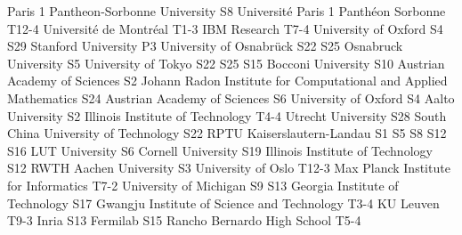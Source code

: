 \begin{multicols}{2}
{Paris 1 Pantheon-Sorbonne University}
{S8}
{}
{}
{}
{}
{}
{}
{Université Paris 1 Panthéon Sorbonne}
{T12-4}
{}
{}
{}
{}
{}
{}
{Université de Montréal}
{T1-3}
{}
{}
{}
{}
{}
{}
{IBM Research}
{T7-4}
{}
{}
{}
{}
{}
{}
{University of Oxford}
{S4}
{S29}
{}
{}
{}
{}
{}
{Stanford University}
{P3}
{}
{}
{}
{}
{}
{}
{University of Osnabrück}
{S22}
{S25}
{}
{}
{}
{}
{}
{Osnabruck University}
{S5}
{}
{}
{}
{}
{}
{}
{University of Tokyo}
{S22}
{S25}
{S15}
{}
{}
{}
{}
{Bocconi University}
{S10}
{}
{}
{}
{}
{}
{}
{Austrian Academy of Sciences}
{S2}
{}
{}
{}
{}
{}
{}
{Johann Radon Institute for Computational and Applied Mathematics}
{S24}
{}
{}
{}
{}
{}
{}
{Austrian Academy of Sciences}
{S6}
{}
{}
{}
{}
{}
{}
{University of Oxford}
{S4}
{}
{}
{}
{}
{}
{}
{Aalto University}
{S2}
{}
{}
{}
{}
{}
{}
{Illinois Institute of Technology}
{T4-4}
{}
{}
{}
{}
{}
{}
{Utrecht University}
{S28}
{}
{}
{}
{}
{}
{}
{South China University of Technology}
{S22}
{}
{}
{}
{}
{}
{}
{RPTU Kaiserslautern-Landau}
{S1}
{S5}
{S8}
{S12}
{S16}
{}
{}
{LUT University}
{S6}
{}
{}
{}
{}
{}
{}
{Cornell University}
{S19}
{}
{}
{}
{}
{}
{}
{Illinois Institute of Technology}
{S12}
{}
{}
{}
{}
{}
{}
{RWTH Aachen University}
{S3}
{}
{}
{}
{}
{}
{}
{University of Oslo}
{T12-3}
{}
{}
{}
{}
{}
{}
{Max Planck Institute for Informatics}
{T7-2}
{}
{}
{}
{}
{}
{}
{University of Michigan}
{S9}
{S13}
{}
{}
{}
{}
{}
{Georgia Institute of Technology}
{S17}
{}
{}
{}
{}
{}
{}
{Gwangju Institute of Science and Technology}
{T3-4}
{}
{}
{}
{}
{}
{}
{KU Leuven}
{T9-3}
{}
{}
{}
{}
{}
{}
{Inria}
{S13}
{}
{}
{}
{}
{}
{}
{Fermilab}
{S15}
{}
{}
{}
{}
{}
{}
{Rancho Bernardo High School}
{T5-4}
{}
{}
{}
{}
{}

\end{multicols}

